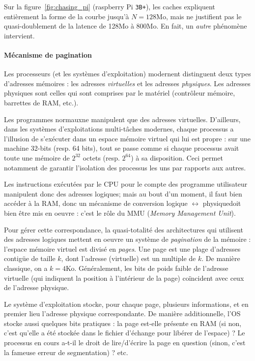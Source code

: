 Sur la figure~\ref{fig:chasing_pi} (raspberry Pi \texttt{3B+}), les caches
expliquent entièrement la forme de la courbe jusqu'à $N=128$Mo, mais ne
justifient pas le quasi-doublement de la latence de 128Mo à 800Mo. En fait, un
\emph{autre} phénomène intervient.

\paragraph{Mécanisme de pagination}

Les processeurs (et les systèmes d'exploitation) modernent distinguent deux
types d'adresses mémoires : les adresses \emph{virtuelles} et les adresses
\emph{physiques}. Les adresses physiques sont celles qui sont comprises par le
matériel (contrôleur mémoire, barrettes de RAM, etc.).

Les programmes \og normaux\fg ne manipulent que des adresses
virtuelles. D'ailleurs, dans les systèmes d'exploitations multi-tâches modernes,
chaque processus a l'illusion de s'exécuter dans un espace mémoire virtuel qui
lui est propre : sur une machine 32-bits (resp. 64 bits), tout se passe comme si
chaque processus avait toute une mémoire de $2^{32}$ octets (resp. $2^{64}$) à
sa disposition. Ceci permet notamment de garantir l'isolation des processus les
uns par rapports aux autres.

Les instructions exécutées par le CPU pour le compte des programme utilisateur
manipulent donc des adresses logiques; mais au bout d'un moment, il faut bien
accéder à la RAM, donc un mécanisme de conversion \og logique $\leftrightarrow$
physique\fg doit bien être mis en oeuvre : c'est le rôle du MMU (\emph{Memory
  Management Unit}).

Pour gérer cette correspondance, la quasi-totalité des architectures qui
utilisent des adresses logiques mettent en oeuvre un système de
\emph{pagination} de la mémoire : l'espace mémoire virtuel est divisé en
\emph{pages}. Une page est une plage d'adresses contigüe de taille $k$, dont
l'adresse (virtuelle) est un multiple de $k$. De manière classique, on a
$k=4$Ko. Généralement, les bits de poids faible de l'adresse virtuelle (qui
indiquent la position à l'intérieur de la page) coïncident avec ceux de
l'adresse physique.

Le système d'exploitation stocke, pour chaque page, plusieurs informations, et
en premier lieu l'adresse physique correspondante. De manière additionnelle,
l'OS stocke aussi quelques bits pratiques : la page est-elle présente en RAM (si
non, c'est qu'elle a été stockée dans le fichier d'échange pour libérer de
l'espace) ? Le processus en cours a-t-il le droit de lire/d'écrire la page en
question (sinon, c'est la fameuse \og erreur de segmentation\fg) ? etc.

